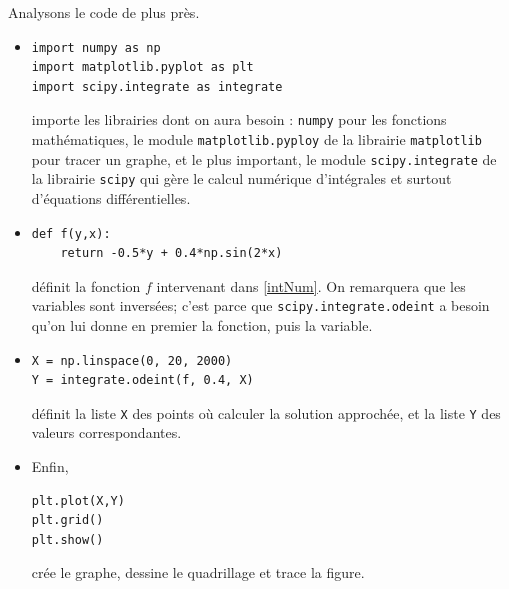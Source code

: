 \documentclass[../main.tex]{subfiles}
\begin{document}
\begin{exe}
Analysons le code de plus près. \begin{itemize}
	\item \begin{verbatim}
import numpy as np
import matplotlib.pyplot as plt
import scipy.integrate as integrate
	\end{verbatim}
	importe les librairies dont on aura besoin : \texttt{numpy} pour les fonctions mathématiques, le module \texttt{matplotlib.pyploy} de la librairie \texttt{matplotlib} pour tracer un graphe, et le plus important, le module \texttt{scipy.integrate} de la librairie \texttt{scipy} qui gère le calcul numérique d'intégrales et surtout d'équations différentielles.
	
	\item \begin{verbatim}
def f(y,x):
    return -0.5*y + 0.4*np.sin(2*x)
	\end{verbatim}
	définit la fonction $f$ intervenant dans \eqref{intNum}. On remarquera que les variables sont inversées; c'est parce que \texttt{scipy.integrate.odeint} a besoin qu'on lui donne en premier la fonction, puis la variable.
	
	\item \begin{verbatim}
X = np.linspace(0, 20, 2000)
Y = integrate.odeint(f, 0.4, X)
	\end{verbatim}
	définit la liste \texttt{X} des points où calculer la solution approchée, et la liste \texttt{Y} des valeurs correspondantes.
	
	\item Enfin, \begin{verbatim}
plt.plot(X,Y)
plt.grid()
plt.show()
	\end{verbatim} 
	crée le graphe, dessine le quadrillage et trace la figure.
\end{itemize}
\end{exe}
\end{document}
